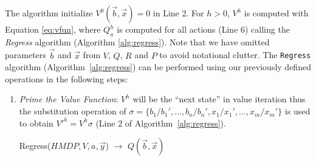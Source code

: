\documentclass[twoside,11pt]{article}
\begin{document}
The algorithm initialize $V^0(\vec{b},\vec{x}) = 0$ in Line 2. For $h > 0$, $V^h$ is computed with Equation \ref{eq:vfun}, where $Q^h_a$ is computed for all actions (Line 6) calling the \emph{Regress} algorithm (Algorithm \ref{alg:regress}). Note that we have omitted parameters $\vec{b}$ and
$\vec{x}$ from $V$, $Q$, $R$ and $P$ to avoid notational clutter.
The \texttt{Regress} algorithm (Algorithm~\ref{alg:regress}) can be performed using  our previously defined operations in the following steps: 
\begin{enumerate}
\item {\it Prime the Value Function}: $V^{h}$ will be
the ``next state'' in value iteration thus the substitution operation of 
$\sigma = \{ b_1 / b_1', \ldots, b_n / b_n', x_1 / x_1', \ldots, x_m / x_m' \}$ is used to obtain
$V'^{h} = V^{h}\sigma$ (Line 2 of Algorithm~\ref{alg:regress}). 

\incmargin{.5em}
\linesnumbered
\begin{algorithm}[t!]
\vspace{-.5mm}
\dontprintsemicolon
{}


\caption{\footnotesize {\sc Regress}($HMDP, V,a,\vec{y}$) $\longrightarrow$ $Q(\vec{b},\vec{x})$ \label{alg:regress}}
\vspace{-1mm}
\end{algorithm}
\decmargin{.5em}



\end{enumerate}
\end{document}
